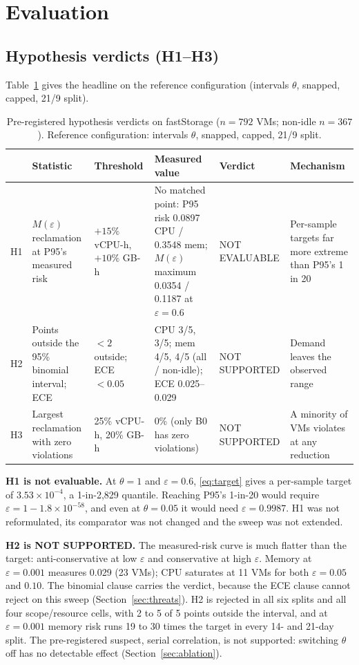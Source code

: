 \documentclass[conference]{IEEEtran}
\newcommand{\Meps}{$M(\varepsilon)$}
\begin{document}
\section{Evaluation}
\label{sec:eval}

\subsection{Hypothesis verdicts (H1--H3)}
Table~\ref{tab:hyp} gives the headline on the reference configuration (intervals $\theta$, snapped, capped, 21/9 split).

\begin{table}[t]
\caption{Pre-registered hypothesis verdicts on fastStorage ($n=792$ VMs; non-idle $n=367$). Reference configuration: intervals $\theta$, snapped, capped, 21/9 split.}
\label{tab:hyp}
\centering
\footnotesize
\begin{tabular}{@{}l p{3.2cm} p{2.4cm} p{5.0cm} l p{2.9cm}@{}}
\toprule
& Statistic & Threshold & Measured value & Verdict & Mechanism \\
\midrule
H1 & \Meps{} reclamation at P95's measured risk & $+15\%$ vCPU-h, $+10\%$ GB-h & No matched point: P95 risk 0.0897 CPU / 0.3548 mem; \Meps{} maximum 0.0354 / 0.1187 at $\varepsilon=0.6$ & NOT EVALUABLE & Per-sample targets far more extreme than P95's 1 in 20 \\
H2 & Points outside the 95\% binomial interval; ECE & $<2$ outside; ECE $<0.05$ & CPU 3/5, 3/5; mem 4/5, 4/5 (all / non-idle); ECE 0.025--0.029 & NOT SUPPORTED & Demand leaves the observed range \\
H3 & Largest reclamation with zero violations & 25\% vCPU-h, 20\% GB-h & 0\% (only B0 has zero violations) & NOT SUPPORTED & A minority of VMs violates at any reduction \\
\bottomrule
\end{tabular}
\end{table}

\textbf{H1 is not evaluable.} At $\theta=1$ and $\varepsilon=0.6$, \eqref{eq:target} gives a per-sample target of $3.53\times10^{-4}$, a 1-in-2,829 quantile. Reaching P95's 1-in-20 would require $\varepsilon = 1 - 1.8\times10^{-58}$, and even at $\theta=0.05$ it would need $\varepsilon=0.9987$. H1 was not reformulated, its comparator was not changed and the sweep was not extended.

\textbf{H2 is NOT SUPPORTED.} The measured-risk curve is much flatter than the target: anti-conservative at low $\varepsilon$ and conservative at high $\varepsilon$. Memory at $\varepsilon=0.001$ measures 0.029 (23 VMs); CPU saturates at 11 VMs for both $\varepsilon=0.05$ and $0.10$. The binomial clause carries the verdict, because the ECE clause cannot reject on this sweep (Section~\ref{sec:threats}). H2 is rejected in all six splits and all four scope/resource cells, with 2 to 5 of 5 points outside the interval, and at $\varepsilon=0.001$ memory risk runs 19 to 30 times the target in every 14- and 21-day split. The pre-registered suspect, serial correlation, is not supported: switching $\theta$ off has no detectable effect (Section~\ref{sec:ablation}).
\end{document}
